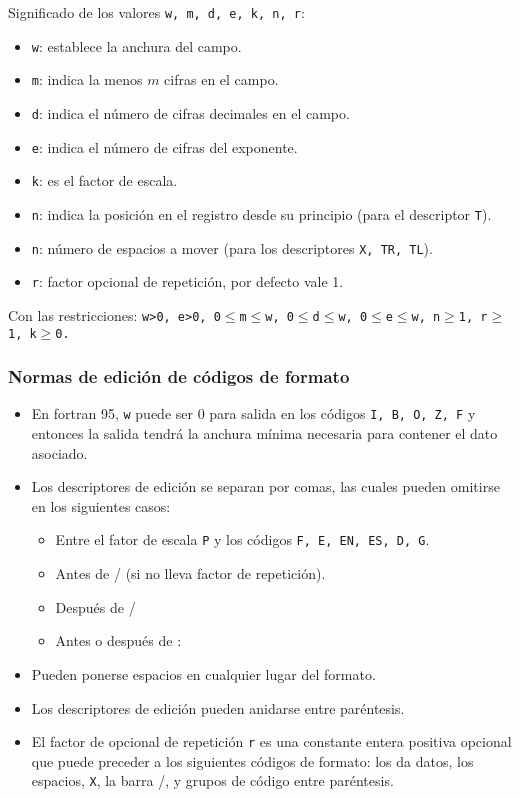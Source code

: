 Significado de los valores {\tt w, m, d, e, k, n, r}:

\begin{itemize}
	\item {\tt w}: establece la anchura del campo.
	\item {\tt m}: indica la menos $m$ cifras en el campo.
	\item {\tt d}: indica el número de cifras decimales en el campo.
	\item {\tt e}: indica el número de cifras del exponente.
	\item {\tt k}: es el factor de escala.
	\item {\tt n}: indica la posición en el registro desde su principio (para el descriptor  {\tt T}).
	\item {\tt n}: número de espacios a mover (para los descriptores {\tt X, TR, TL}).
	\item {\tt r}: factor opcional de repetición, por defecto vale 1.
\end{itemize}
Con las restricciones: \texttt{w>0, e>0, 0$\leq$m$\leq$w, 0$\leq$d$\leq$w, 0$\leq$e$\leq$w, n$\geq$1, r$\geq$1, k$\geq$0.}
 
\subsubsection{Normas de edición de códigos de formato}

\begin{itemize}
	\item En fortran 95, \texttt{w} puede ser 0 para salida en los códigos \texttt{I, B, O, Z, F} y entonces la salida tendrá la anchura mínima necesaria para contener el dato asociado.
	\item Los descriptores de edición se separan por comas, las cuales pueden omitirse en los siguientes casos:
	\begin{itemize}
		\item Entre el fator de escala {\tt P} y los códigos \texttt{F, E, EN, ES, D, G}.
		\item Antes de / (si no lleva factor de repetición).
		\item Después de /
		\item Antes o después de :		
	\end{itemize}
	\item Pueden ponerse espacios en cualquier lugar del formato.
	\item Los descriptores de edición pueden anidarse entre paréntesis.
	\item El factor de opcional de repetición {\tt r} es una constante entera positiva opcional que puede preceder a los siguientes códigos de formato: los da datos, los espacios, {\tt X}, la barra /, y grupos de código entre paréntesis. 
\end{itemize}
